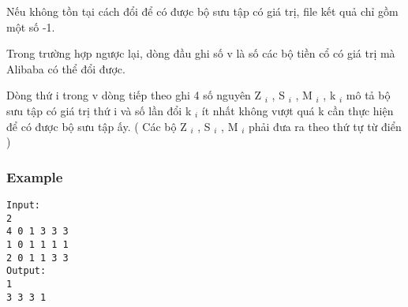 Nếu không tồn tại cách đổi để có được bộ sưu tập có giá trị, file kết quả chỉ gồm một số -1.

Trong trường hợp ngược lại, dòng đầu ghi số v là số các bộ tiền cổ có giá trị mà Alibaba có thể đổi được.

Dòng thứ i trong v dòng tiếp theo ghi 4 số nguyên Z $_ i $ , S $_ i $ , M $_ i $ , k $_ i $ mô tả bộ sưu tập có giá trị thứ i và số lần đổi k $_ i $ ít nhất không vượt quá k cần thực hiện để có được bộ sưu tập ấy. ( Các bộ Z $_ i $ , S $_ i $ , M $_ i $ phải đưa ra theo thứ tự từ điển )

\subsubsection{Example}
\begin{verbatim}
Input:
2
4 0 1 3 3 3
1 0 1 1 1 1
2 0 1 1 3 3
Output:
1
3 3 3 1
\end{verbatim}